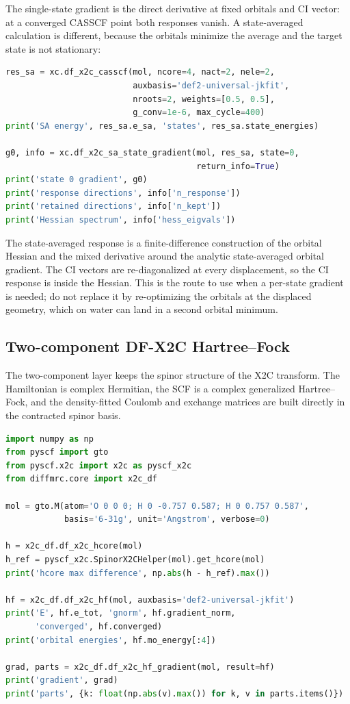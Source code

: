 The single-state gradient is the direct derivative at fixed orbitals
and CI vector: at a converged CASSCF point both responses vanish.  A
state-averaged calculation is different, because the orbitals minimize
the average and the target state is not stationary:

\begin{lstlisting}[language=Python]
res_sa = xc.df_x2c_casscf(mol, ncore=4, nact=2, nele=2,
                          auxbasis='def2-universal-jkfit',
                          nroots=2, weights=[0.5, 0.5],
                          g_conv=1e-6, max_cycle=400)
print('SA energy', res_sa.e_sa, 'states', res_sa.state_energies)

g0, info = xc.df_x2c_sa_state_gradient(mol, res_sa, state=0,
                                       return_info=True)
print('state 0 gradient', g0)
print('response directions', info['n_response'])
print('retained directions', info['n_kept'])
print('Hessian spectrum', info['hess_eigvals'])
\end{lstlisting}

The state-averaged response is a finite-difference construction of the
orbital Hessian and the mixed derivative around the analytic
state-averaged orbital gradient.  The CI vectors are re-diagonalized at
every displacement, so the CI response is inside the Hessian.  This is
the route to use when a per-state gradient is needed; do not replace it
by re-optimizing the orbitals at the displaced geometry, which on water
can land in a second orbital minimum.

\subsection{Two-component DF-X2C Hartree--Fock}

The two-component layer keeps the spinor structure of the X2C
transform.  The Hamiltonian is complex Hermitian, the SCF is a complex
generalized Hartree--Fock, and the density-fitted Coulomb and exchange
matrices are built directly in the contracted spinor basis.

\begin{lstlisting}[language=Python]
import numpy as np
from pyscf import gto
from pyscf.x2c import x2c as pyscf_x2c
from diffmrc.core import x2c_df

mol = gto.M(atom='O 0 0 0; H 0 -0.757 0.587; H 0 0.757 0.587',
            basis='6-31g', unit='Angstrom', verbose=0)

h = x2c_df.df_x2c_hcore(mol)
h_ref = pyscf_x2c.SpinorX2CHelper(mol).get_hcore(mol)
print('hcore max difference', np.abs(h - h_ref).max())

hf = x2c_df.df_x2c_hf(mol, auxbasis='def2-universal-jkfit')
print('E', hf.e_tot, 'gnorm', hf.gradient_norm,
      'converged', hf.converged)
print('orbital energies', hf.mo_energy[:4])

grad, parts = x2c_df.df_x2c_hf_gradient(mol, result=hf)
print('gradient', grad)
print('parts', {k: float(np.abs(v).max()) for k, v in parts.items()})
\end{lstlisting}

